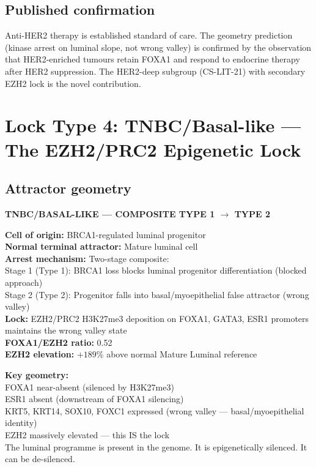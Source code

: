 \documentclass[12pt, a4paper]{article}
\begin{document}
\subsection{Published confirmation}

Anti-HER2 therapy is established standard of care.
The geometry prediction (kinase arrest on luminal
slope, not wrong valley) is confirmed by the
observation that HER2-enriched tumours retain FOXA1
and respond to endocrine therapy after HER2
suppression. The HER2-deep subgroup (CS-LIT-21)
with secondary EZH2 lock is the novel contribution.

\section{Lock Type 4: TNBC/Basal-like --- The EZH2/PRC2
Epigenetic Lock}

\subsection{Attractor geometry}

\begin{center}
\colorbox{mechanismbox}{
\begin{minipage}{0.85\textwidth}
\vspace{0.5em}
\textbf{TNBC/BASAL-LIKE --- COMPOSITE TYPE 1
$\rightarrow$ TYPE 2}

\medskip
\textbf{Cell of origin:} BRCA1-regulated luminal
progenitor\\
\textbf{Normal terminal attractor:} Mature luminal cell\\
\textbf{Arrest mechanism:} Two-stage composite:\\
\quad Stage 1 (Type 1): BRCA1 loss blocks luminal
progenitor differentiation (blocked approach)\\
\quad Stage 2 (Type 2): Progenitor falls into
basal/myoepithelial false attractor (wrong valley)\\
\textbf{Lock:} EZH2/PRC2 H3K27me3 deposition on
FOXA1, GATA3, ESR1 promoters maintains the wrong
valley state\\
\textbf{FOXA1/EZH2 ratio:} 0.52\\
\textbf{EZH2 elevation:} $+189\%$ above normal
Mature Luminal reference

\medskip
\textbf{Key geometry:}\\
FOXA1 near-absent (silenced by H3K27me3)\\
ESR1 absent (downstream of FOXA1 silencing)\\
KRT5, KRT14, SOX10, FOXC1 expressed
(wrong valley --- basal/myoepithelial identity)\\
EZH2 massively elevated --- this IS the lock\\
The luminal programme is present in the genome.
It is epigenetically silenced. It can be de-silenced.
\vspace{0.5em}
\end{minipage}
}
\end{center}
\end{document}
